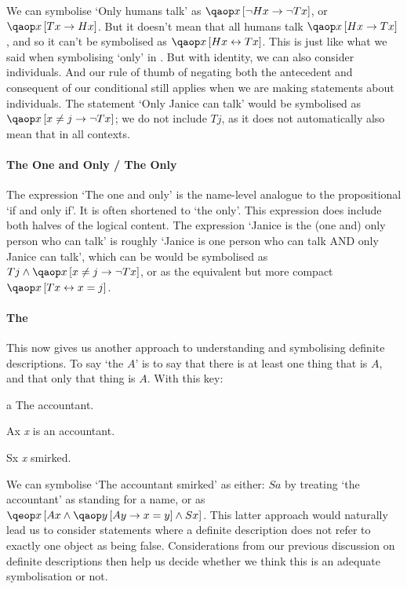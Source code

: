 \documentclass[PHIL101-Textbook.tex]{subfiles}
\begin{document}
We can symbolise `Only humans talk' as $\qab{x}{\enot Hx \eif \enot Tx}$, or $\qab{x}{Tx \eif Hx}$. But it doesn't mean that all humans talk $\qab{x}{Hx \eif Tx}$, and so it can't be symbolised as $\qab{x}{Hx \eiff Tx}$. This is just like what we said when symbolising `only' in \tfl. But with identity, we can also consider individuals. And our rule of thumb of negating both the antecedent and consequent of our conditional still applies when we are making statements about individuals. The statement `Only Janice can talk' would be symbolised as $\qab{x}{x\neq j \eif \enot Tx}$; we do not include $Tj$, as it does not automatically also mean that in all contexts. 

\paragraph{The One and Only / The Only}
The expression `The one and only' is the name-level analogue to the propositional `if and only if'. It is often shortened to `the only'. This expression does include both halves of the logical content. The expression `Janice is the (one and) only person who can talk' is roughly `Janice is one person who can talk AND only Janice can talk', which can be would be symbolised as $Tj \eand \qab{x}{x\neq j \eif \enot Tx}$, or as the equivalent but more compact $\qab{x}{Tx \eiff x = j}$.


\paragraph{The}
This now gives us another approach to understanding and symbolising  definite descriptions. To say `the $A$' is to say that there is at least one thing that is $A$, and that only that thing is $A$. With this key:
\begin{ekey}
\item[a] The accountant.
\item[Ax] \textit{x} is an accountant.
\item[Sx] \textit{x} smirked.
\end{ekey}

We can symbolise `The accountant smirked' as either: $Sa$ by treating `the accountant' as standing for a name, or as $\qeb{x}{Ax \eand \qab{y}{Ay \eif x=y} \eand Sx}$. This latter approach would naturally lead us to consider statements where a definite description does not refer to exactly one object as being false. Considerations from our previous discussion on definite descriptions then help us decide whether we think this is an adequate symbolisation or not.
\end{document}
